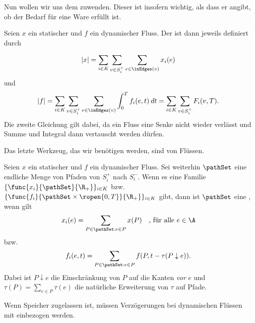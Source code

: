 Nun wollen wir uns dem  zuwenden. Dieser ist insofern wichtig,
als dass er angibt, ob der Bedarf für eine Ware erfüllt ist.

\begin{definition}
    Seien $x$ ein statischer und $f$ ein dynamischer Fluss. Der 
    ist dann jeweils definiert durch

    \[
        |x| = \sum_{i \in K} \sum_{v \in S_i^+} \sum_{e \in \inEdges(v)} x_i(e)
    \]
    und
    \[
        |f| = \sum_{i \in K} \sum_{v \in S_i^+}
                \sum_{e \in \inEdges(v)} \int_0^T f_i(e,t) \: dt
            = \sum_{i \in K} \sum_{v \in S_i^+} F_i(v,T).
    \]
    Die zweite Gleichung gilt dabei, da ein Fluss eine Senke nicht wieder
    verlässt und Summe und Integral dann vertauscht werden dürfen.
\end{definition}

Das letzte Werkzeug, das wir benötigen werden, sind 
von Flüssen.

\begin{definition}\label{def:path_flow}
    Seien $x$ ein statischer und $f$ ein dynamischer Fluss.
    Sei weiterhin $\pathSet$ eine endliche Menge von Pfaden von $S_i^+$ nach
    $S_i^-$. Wenn es eine Familie $\{\func{x_i}{\pathSet}{\R_+}\}_{i \in K}$
    bzw. $\{\func{f_i}{\pathSet \times \ropen{0,T}}{\R_+}\}_{i \in K}$ gibt,
    dann ist $\pathSet$ eine , wenn gilt
    \[
        x_i(e) = \sum_{P \in \pathSet : e \in P} x(P) \quad \text{, für alle } e \in \A
    \]
    bzw.
    \[
        f_i(e, t) = \sum_{P \in \pathSet : e \in P} f(P, t - \tau(P \downarrow e)) .
    \]
    Dabei ist $P \downarrow e$ die Einschränkung von $P$ auf die Kanten \emph{vor} $e$
    und $\tau(P) = \sum_{e \in P} \tau(e)$ die natürliche Erweiterung von $\tau$ auf
    Pfade.

    Wenn Speicher zugelassen ist, müssen Verzögerungen bei dynamischen Flüssen
    mit einbezogen werden.
\end{definition}

